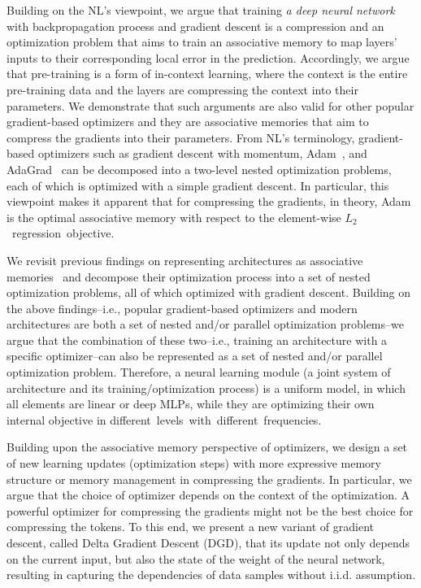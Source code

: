 Building on the NL's viewpoint, we argue that training \emph{a deep neural network} with backpropagation process and gradient descent is a compression and an optimization problem that aims to train an associative memory to map layers' inputs to their corresponding local error in the prediction. Accordingly, we argue that pre-training is a form of in-context learning, where the context is the entire pre-training data and the layers are compressing the context into their parameters. We demonstrate that such arguments are also valid for other popular gradient-based optimizers and they are associative memories that aim to compress the gradients into their parameters. From NL's terminology, gradient-based optimizers such as gradient descent with momentum, Adam~\citep{kingma2014adam}, and AdaGrad~\citep{duchi2011adaptive} can be decomposed into a two-level nested optimization problems, each of which is optimized with a simple gradient descent. In particular, this viewpoint makes it apparent that for compressing the gradients, in theory, Adam is the optimal associative memory with respect to the element-wise $L_2$~regression~objective.

We revisit previous findings on representing architectures as associative memories~\citep{behrouz2025Miras} and decompose their optimization process into a set of nested optimization problems, all of which optimized with gradient descent. Building on the above findings–i.e., popular gradient-based optimizers and modern architectures are both a set of nested and/or parallel optimization problems–we argue that the combination of these two–i.e., training an architecture with a specific optimizer–can also be represented as a set of nested and/or parallel optimization problem. Therefore, a neural learning module (a joint system of architecture and its training/optimization process) is a uniform model, in which all elements are linear or deep MLPs, while they are optimizing their own internal objective in different~levels~with~different~frequencies. 

Building upon the associative memory perspective of optimizers, we design a set of new learning updates (optimization steps) with more expressive memory structure or memory management in compressing the gradients. In particular, we argue that the choice of optimizer depends on the context of the optimization. A powerful optimizer for compressing the gradients might not be the best choice for compressing the tokens. To this end, we present a new variant of gradient descent, called Delta Gradient Descent (DGD), that its update not only depends on the current input, but also the state of the weight of the neural network, resulting in capturing the dependencies of data samples without i.i.d. assumption. 


